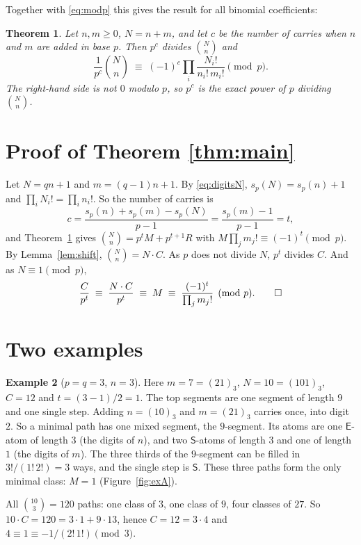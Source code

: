 \documentclass[11pt]{article}
\newtheorem{theorem}{Theorem}
\theoremstyle{definition}
\newtheorem{example}[theorem]{Example}
\theoremstyle{remark}
\newcommand{\E}{\textsf{E}}
\newcommand{\Ss}{\textsf{S}}
\begin{document}
Together with \eqref{eq:modp} this gives the result for all binomial coefficients:

\begin{theorem}\label{thm:binom}
Let $n,m\ge0$, $N=n+m$, and let $c$ be the number of carries when $n$ and $m$ are added in base $p$. Then
$p^c$ divides $\binom Nn$ and
\[
\frac1{p^c}\binom Nn\;\equiv\;(-1)^c\prod_i\frac{N_i!}{n_i!\,m_i!}\pmod p .
\]
The right-hand side is not $0$ modulo $p$, so $p^c$ is the exact power of $p$ dividing $\binom Nn$.
\end{theorem}

\section{Proof of Theorem \ref{thm:main}}\label{sec:proof}

Let $N=qn+1$ and $m=(q-1)n+1$. By \eqref{eq:digitsN}, $s_p(N)=s_p(n)+1$ and $\prod_iN_i!=\prod_in_i!$. So the
number of carries is
\[
c=\frac{s_p(n)+s_p(m)-s_p(N)}{p-1}=\frac{s_p(m)-1}{p-1}=t ,
\]
and Theorem~\ref{thm:binom} gives $\binom Nn=p^tM+p^{t+1}R$ with $M\prod_jm_j!\equiv(-1)^t\pmod p$. By
Lemma~\ref{lem:shift}, $\binom Nn=N\cdot C$. As $p$ does not divide $N$, $p^t$ divides $C$. And as $N\equiv1\pmod p$,
\[
\frac C{p^t}\;\equiv\;\frac{N\cdot C}{p^t}\;\equiv\;M\;\equiv\;\frac{(-1)^t}{\prod_jm_j!}\pmod p. \qed
\]

\section{Two examples}

\begin{example}[$p=q=3$, $n=3$]\label{ex:A}
Here $m=7=(21)_3$, $N=10=(101)_3$, $C=12$ and $t=(3-1)/2=1$. The top segments are one segment of length $9$
and one single step. Adding $n=(10)_3$ and $m=(21)_3$ carries once, into digit $2$. So a minimal path has
one mixed segment, the $9$-segment. Its atoms are one $\E$-atom of length $3$ (the digits of $n$), and two
$\Ss$-atoms of length $3$ and one of length $1$ (the digits of $m$). The three thirds of the $9$-segment can be
filled in $3!/(1!\,2!)=3$ ways, and the single step is $\Ss$. These three paths form the only minimal class:
$M=1$ (Figure~\ref{fig:exA}).

All $\binom{10}3=120$ paths: one class of $3$, one class of $9$, four classes of $27$. So
$10\cdot C=120=3\cdot1+9\cdot13$, hence $C=12=3\cdot 4$ and $4\equiv1\equiv-1/(2!\,1!)\pmod 3$.
\end{example}
\end{document}
